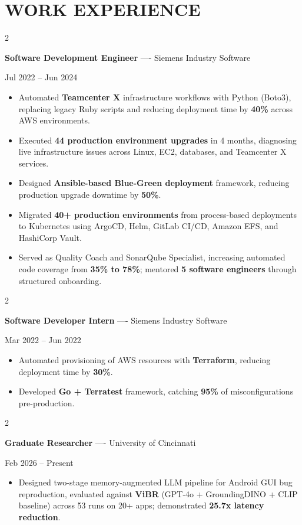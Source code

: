 \documentclass[10pt, letterpaper]{article}
\newenvironment{highlights}{
    \begin{itemize}[
        topsep=0.10 cm,
        parsep=0.06 cm,
        partopsep=0pt,
        itemsep=0.06 cm,
        leftmargin=12pt
    ]
}{
    \end{itemize}
}
\newenvironment{twocolentry}[2][]{
    \onecolentry
    \def\secondColumn{#2}
    \setcolumnwidth{\fill, 4.5 cm}
    \begin{paracol}{2}
}{
    \switchcolumn \raggedleft \secondColumn
    \end{paracol}
    \endonecolentry
}
\begin{document}
\section{WORK EXPERIENCE}
\begin{twocolentry}{Jul 2022 -- Jun 2024}
\textbf{Software Development Engineer} ---- Siemens Industry Software
\end{twocolentry}
\begin{highlights}
  \item Automated \textbf{Teamcenter X} infrastructure workflows with Python (Boto3), replacing legacy Ruby scripts and reducing deployment time by \textbf{40\%} across AWS environments.
  \item Executed \textbf{44 production environment upgrades} in 4 months, diagnosing live infrastructure issues across Linux, EC2, databases, and Teamcenter X services.
  \item Designed \textbf{Ansible-based Blue-Green deployment} framework, reducing production upgrade downtime by \textbf{50\%}.
  \item Migrated \textbf{40+ production environments} from process-based deployments to Kubernetes using ArgoCD, Helm, GitLab CI/CD, Amazon EFS, and HashiCorp Vault.
  \item Served as Quality Coach and SonarQube Specialist, increasing automated code coverage from \textbf{35\% to 78\%}; mentored \textbf{5 software engineers} through structured onboarding.
\end{highlights}

\vspace{0.15 cm}

\begin{twocolentry}{Mar 2022 -- Jun 2022}
\textbf{Software Developer Intern} ---- Siemens Industry Software
\end{twocolentry}
\begin{highlights}
  \item Automated provisioning of AWS resources with \textbf{Terraform}, reducing deployment time by \textbf{30\%}.
  \item Developed \textbf{Go + Terratest} framework, catching \textbf{95\%} of misconfigurations pre-production.
\end{highlights}

\vspace{0.15 cm}

\begin{twocolentry}{Feb 2026 -- Present}
\textbf{Graduate Researcher} ---- University of Cincinnati
\end{twocolentry}
\begin{highlights}
  \item Designed two-stage memory-augmented LLM pipeline for Android GUI bug reproduction, evaluated against \textbf{ViBR} (GPT-4o + GroundingDINO + CLIP baseline) across 53 runs on 20+ apps; demonstrated \textbf{25.7x latency reduction}.
\end{highlights}
\end{document}
